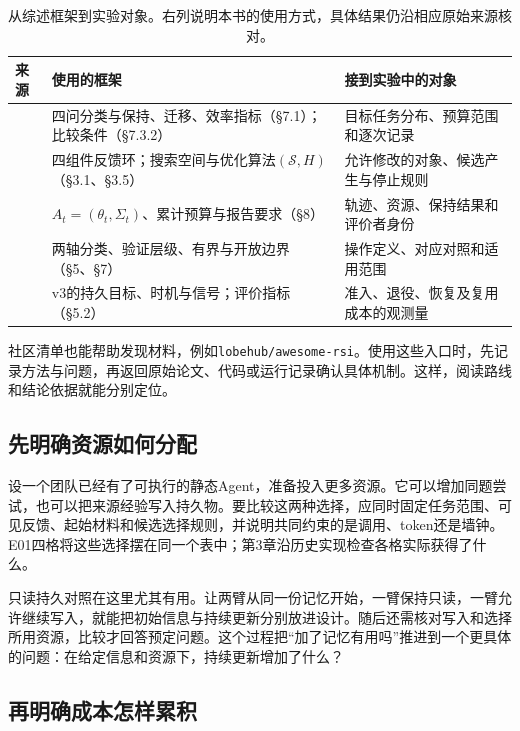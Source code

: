 \begin{table}[htbp]
\centering\small
\begin{tabular}{@{}p{3.0cm}p{5.0cm}p{5.2cm}@{}}
\toprule
来源 & 使用的框架 & 接到实验中的对象 \\
\midrule
\cite{self-evolving-survey-2507} & 四问分类与保持、迁移、效率指标（§7.1）；比较条件（§7.3.2） & 目标任务分布、预算范围和逐次记录 \\
\cite{self-evolving-comprehensive-2508} & 四组件反馈环；搜索空间与优化算法$(\mathcal S,H)$（§3.1、§3.5） & 允许修改的对象、候选产生与停止规则 \\
\cite{self-improvements-survey-2607} & $A_t=(\theta_t,\Sigma_t)$、累计预算与报告要求（§8） & 轨迹、资源、保持结果和评价者身份 \\
\cite{rsi-survey-2607} & 两轴分类、验证层级、有界与开放边界（§5、§7） & 操作定义、对应对照和适用范围 \\
\cite{coding-survey-2608} & v3的持久目标、时机与信号；评价指标（§5.2） & 准入、退役、恢复及复用成本的观测量 \\
\bottomrule
\end{tabular}
\caption{从综述框架到实验对象。右列说明本书的使用方式，具体结果仍沿相应原始来源核对。}
\label{tab:diff}
\end{table}

社区清单也能帮助发现材料，例如\texttt{lobehub/awesome-rsi}\cite{awesome-rsi}。使用这些入口时，先记录方法与问题，再返回原始论文、代码或运行记录确认具体机制。这样，阅读路线和结论依据就能分别定位。

\subsection{先明确资源如何分配}

设一个团队已经有了可执行的静态Agent，准备投入更多资源。它可以增加同题尝试，也可以把来源经验写入持久物。要比较这两种选择，应同时固定任务范围、可见反馈、起始材料和候选选择规则，并说明共同约束的是调用、token还是墙钟。E01四格将这些选择摆在同一个表中；第3章沿历史实现检查各格实际获得了什么。

只读持久对照在这里尤其有用。让两臂从同一份记忆开始，一臂保持只读，一臂允许继续写入，就能把初始信息与持续更新分别放进设计。随后还需核对写入和选择所用资源，比较才回答预定问题。这个过程把“加了记忆有用吗”推进到一个更具体的问题：在给定信息和资源下，持续更新增加了什么？

\subsection{再明确成本怎样累积}

